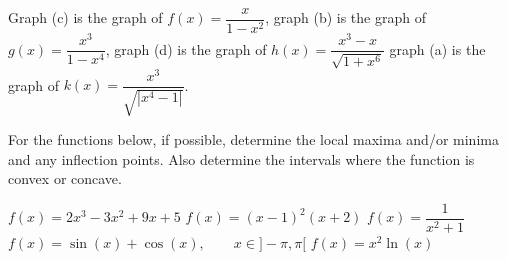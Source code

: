 \begin{Exercise}[difficulty = 1, label = oef_functieverloop]
\begin{Exercise}[difficulty = 2, label = oef_functieverloop]
\begin{figure}[H]
\end{figure}

\ifanalysis\end{Exercise}\fi\ifcalculus\end{Exercise}\fi

\begin{Answer}\phantom{}
    Graph (c) is the graph of $f(x) = \dfrac{x}{1-x^2}$, graph (b) is the graph of $g(x) = \dfrac{x^3}{1-x^4}$, graph (d) is the graph of $h(x) = \dfrac{x^3 - x}{\sqrt{1+x^6}}$ graph (a) is the graph of $k(x) = \dfrac{x^3}{\sqrt{|x^4-1|}}$.
\end{Answer}


\begin{Exercise} For the functions below, if possible, determine the local maxima and/or minima and any inflection points. Also determine the intervals where the function is convex or concave.
\begin{multicols}{2}
    \Question[difficulty = 1] $f(x) = 2x^3-3x^2+9x+5 $
    \ifcalculus\Question[difficulty = 1] $f(x) = (x-1)^2(x+2) $\fi
    \ifanalysis\Question[difficulty = 1]\fi\ifcalculus\Question[difficulty = 2]\fi $f(x) = \dfrac{1}{x^2+1}$
    \Question[difficulty = 1] $f(x) = \sin (x) + \cos (x), \qquad x \in ]-\pi,\pi[$ 
    \Question[difficulty = 1] $f(x) = x^2 \ln (x) $ 
    \EndCurrentQuestion
\end{multicols}

\end{Exercise}

